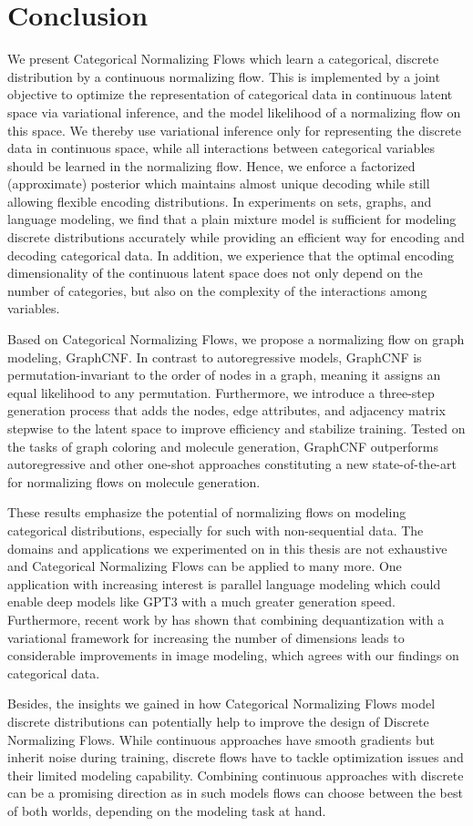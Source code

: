 \section{Conclusion}
\label{sec:conclusion}
We present Categorical Normalizing Flows which learn a categorical, discrete distribution by a continuous normalizing flow.
This is implemented by a joint objective to optimize the representation of categorical data in continuous latent space via variational inference, and the model likelihood of a normalizing flow on this space. 
We thereby use variational inference only for representing the discrete data in continuous space, while all interactions between categorical variables should be learned in the normalizing flow.
Hence, we enforce a factorized (approximate) posterior which maintains almost unique decoding while still allowing flexible encoding distributions. 
In experiments on sets, graphs, and language modeling, we find that a plain mixture model is sufficient for modeling discrete distributions accurately while providing an efficient way for encoding and decoding categorical data. 
In addition, we experience that the optimal encoding dimensionality of the continuous latent space does not only depend on the number of categories, but also on the complexity of the interactions among variables.

Based on Categorical Normalizing Flows, we propose a normalizing flow on graph modeling, GraphCNF.
In contrast to autoregressive models, GraphCNF is permutation-invariant to the order of nodes in a graph, meaning it assigns an equal likelihood to any permutation.
Furthermore, we introduce a three-step generation process that adds the nodes, edge attributes, and adjacency matrix stepwise to the latent space to improve efficiency and stabilize training.
Tested on the tasks of graph coloring and molecule generation, GraphCNF outperforms autoregressive and other one-shot approaches constituting a new state-of-the-art for normalizing flows on molecule generation. 

These results emphasize the potential of normalizing flows on modeling categorical distributions, especially for such with non-sequential data. 
The domains and applications we experimented on in this thesis are not exhaustive and Categorical Normalizing Flows can be applied to many more. 
One application with increasing interest is parallel language modeling which could enable deep models like GPT3 \cite{GPT3} with a much greater generation speed.
Furthermore, recent work by \citet{VFlow} has shown that combining dequantization with a variational framework for increasing the number of dimensions leads to considerable improvements in image modeling, which agrees with our findings on categorical data.

Besides, the insights we gained in how Categorical Normalizing Flows model discrete distributions can potentially help to improve the design of Discrete Normalizing Flows.
While continuous approaches have smooth gradients but inherit noise during training, discrete flows have to tackle optimization issues and their limited modeling capability.
Combining continuous approaches with discrete can be a promising direction as in such models flows can choose between the best of both worlds, depending on the modeling task at hand.